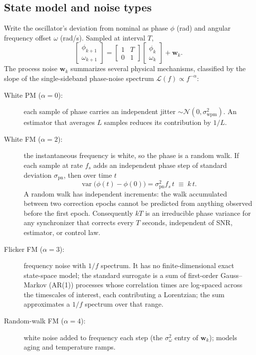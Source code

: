 \documentclass[10pt]{article}
\begin{document}
\subsection{State model and noise types}
Write the oscillator's deviation from nominal as phase $\phi$ (rad) and
angular frequency offset $\omega$ (rad/s). Sampled at interval $T$,
\begin{equation}
\begin{bmatrix}\phi_{k+1}\\ \omega_{k+1}\end{bmatrix}
=\begin{bmatrix}1 & T\\ 0 & 1\end{bmatrix}
\begin{bmatrix}\phi_{k}\\ \omega_{k}\end{bmatrix}+\mathbf{w}_k .
\label{eq:oscmodel}
\end{equation}
The process noise $\mathbf{w}_k$ summarizes several physical mechanisms,
classified by the slope of the single-sideband phase-noise spectrum
$\mathcal{L}(f)\propto f^{-\alpha}$:
\begin{description}
\item[White PM ($\alpha=0$):] each sample of phase carries an independent
jitter $\sim\mathcal{N}(0,\sigma_{\mathrm{wpm}}^2)$. An estimator that
averages $L$ samples reduces its contribution by $1/L$.
\item[White FM ($\alpha=2$):] the instantaneous frequency is white, so the
phase is a random walk. If each sample at rate $f_s$ adds an independent
phase step of standard deviation $\sigma_{\mathrm{pn}}$, then over time
$t$
\begin{equation}
\operatorname{var}\bigl(\phi(t)-\phi(0)\bigr)=\sigma_{\mathrm{pn}}^2 f_s\, t
\;\equiv\; k\,t .
\label{eq:walk}
\end{equation}
A random walk has independent increments: the walk accumulated between
two correction epochs cannot be predicted from anything observed before
the first epoch. Consequently $kT$ is an irreducible phase variance for
any synchronizer that corrects every $T$ seconds, independent of SNR,
estimator, or control law.
\item[Flicker FM ($\alpha=3$):] frequency noise with $1/f$ spectrum. It
has no finite-dimensional exact state-space model; the standard surrogate
is a sum of first-order Gauss--Markov (AR(1)) processes whose correlation
times are log-spaced across the timescales of interest, each contributing
a Lorentzian; the sum approximates a $1/f$ spectrum over that range.
\item[Random-walk FM ($\alpha=4$):] white noise added to frequency each
step (the $\sigma_\omega^2$ entry of $\mathbf{w}_k$); models aging and
temperature ramps.
\end{description}
\end{document}
